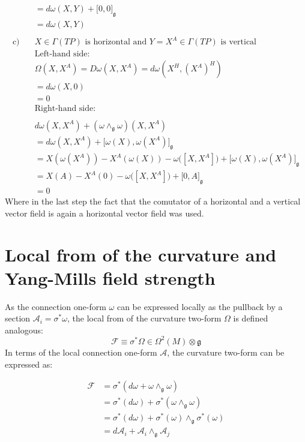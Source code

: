 \begin{align*}
  &= d\omega(X,Y) + \big[ 0, 0 \big]_\mathfrak{g} \\
  &= d\omega(X,Y) \\
  \\
  \text{c)} \quad & X \in \Gamma(TP) \text{ is horizontal and } Y=X^A \in \Gamma(TP) \text{ is vertical} \\
      & \text{Left-hand side:} \\
  &\Omega(X,X^A) = D\omega(X,X^A) = d\omega(X^H, (X^A)^H) \\
  &= d\omega(X, 0) \\
  &= 0 \\
    &\text{Right-hand side:} \\
    \\
  &d\omega(X,X^A) + (\omega \wedge_{\mathfrak{g}} \omega)(X,X^A) \\
  &= d\omega(X, X^A) + \big[ \omega(X), \omega(X^A) \big]_\mathfrak{g} \\
  &= X(\omega(X^A)) - X^A(\omega(X)) - \omega\big( [X,X^A] \big) + \big[ \omega(X), \omega(X^A) \big]_\mathfrak{g} \\
  &= X(A) - X^A(0) - \omega\big( [X,X^A] \big) + \big[ 0, A \big]_\mathfrak{g} \\
  &= 0
\end{align*}
Where in the last step the fact that the comutator of a horizontal and a vertical vector field is again a horizontal vector field was used\cite{NakaharaGeometrytopologyphysics2005}.


\section{Local from of the curvature and Yang-Mills field strength}

As the connection one-form $\omega$ can be expressed locally as the pullback by a section $\mathcal{A}_i = \sigma^*\omega$, the local from of the curvature two-form $\Omega$ is defined analogous\cite{NakaharaGeometrytopologyphysics2005}:
\[ \mathscr{F} \equiv \sigma^*\Omega \in \Omega^2(M)\otimes\mathfrak{g} \]
In terms of the local connection one-form $\mathcal{A}$, the curvature two-form can be expressed as:

\begin{align*}
  \mathscr{F} &= \sigma^*(d\omega + \omega \wedge_\mathfrak{g} \omega) \\
  &= \sigma^*(d\omega) + \sigma^*(\omega \wedge_\mathfrak{g} \omega) \\
  &= \sigma^*(d\omega) + \sigma^*(\omega) \wedge_\mathfrak{g} \sigma^*(\omega) \\
  &= d\mathcal{A}_i + \mathcal{A}_i \wedge_\mathfrak{g} \mathcal{A}_j
\end{align*}

